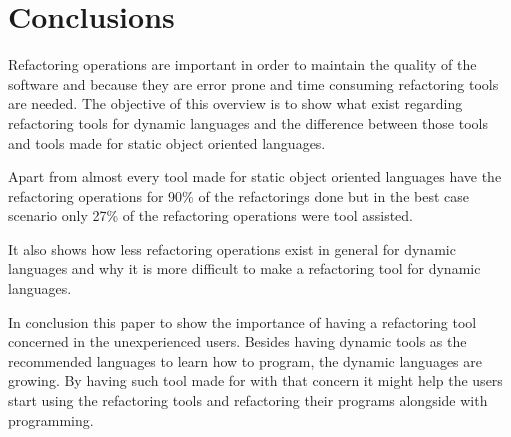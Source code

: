 
% 
% 

\section{Conclusions}



Refactoring operations are important in order to maintain the quality of the software and because they are error prone and time consuming refactoring tools are needed.
The objective of this overview is to show what exist regarding refactoring tools for dynamic languages and the difference between those tools and tools made for static object oriented languages.

Apart from almost  every tool made for static object oriented languages have the refactoring operations for 90\% of the refactorings done but in the best case scenario only 27\% of the refactoring operations were tool assisted.

It also shows how less refactoring operations exist in general for dynamic languages and why it is more difficult to make a refactoring tool for dynamic languages.


In conclusion this paper to show the importance of having a refactoring tool concerned in the unexperienced users. Besides having dynamic tools as the recommended languages to learn how to program, the dynamic languages are growing. By having such tool made for with that concern it might help the users start using the refactoring tools and refactoring their programs alongside with programming.

